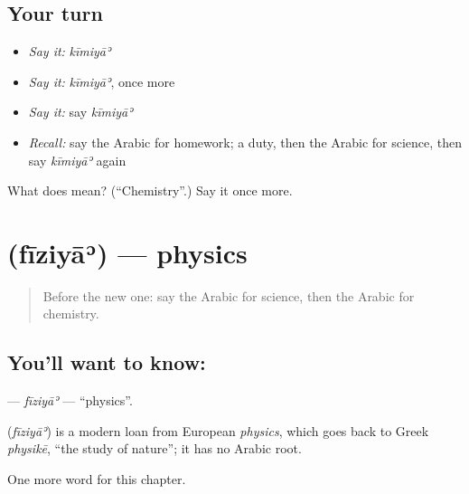 \subsection*{Your turn}
\begin{itemize}
\raggedright
  \item \emph{Say it:} \emph{kīmiyāʾ}
  \item \emph{Say it:} \emph{kīmiyāʾ}, once more
  \item \emph{Say it:} say \emph{kīmiyāʾ}
  \item \emph{Recall:} say the Arabic for homework; a duty, then the Arabic for science, then say \emph{kīmiyāʾ} again
\end{itemize}

\begin{tcolorbox}[breakable,colback=teal!4,colframe=teal!35!black,title={Before you move on}]
What does  mean? (\textquotedblleft{}Chemistry\textquotedblright{}.) Say it once more.
\end{tcolorbox}
\section[\texorpdfstring{\ar{فيزياء} (fīziyāʾ)}{فيزياء (fīziyāʾ)}]{ (fīziyāʾ) — physics}

\label{lesson:AR-C222-fiziya}



\begin{quote}
Before the new one: say the Arabic for science, then the Arabic for chemistry.
\end{quote}

\subsection*{You'll want to know: }
\textbf{} — \emph{fīziyāʾ} — \textquotedblleft{}physics\textquotedblright{}.

\begin{cousinweb}
\textbf{} (\emph{fīziyāʾ}) is a modern loan from European \emph{physics}, which goes back to Greek \emph{physikē}, \textquotedblleft{}the study of nature\textquotedblright{}; it has no Arabic root.
\end{cousinweb}

\begin{grammarlens}[title={What you've built}]
One more word for this chapter.
\end{grammarlens}

